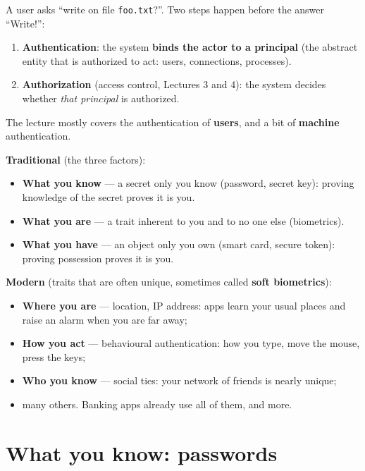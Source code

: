 \begin{defnbox}[title=Where does authentication fit?]
A user asks ``write on file \texttt{foo.txt}?''. Two steps happen before the answer ``Write!'':
\begin{enumerate}
  \item \textbf{Authentication}: the system \textbf{binds the actor to a principal} (the abstract
        entity that is authorized to act: users, connections, processes).
  \item \textbf{Authorization} (access control, Lectures 3 and 4): the system decides whether
        \emph{that principal} is authorized.
\end{enumerate}
The lecture mostly covers the authentication of \textbf{users}, and a bit of \textbf{machine}
authentication.
\end{defnbox}

\begin{defnbox}[title=Ways to prove who you are]
\textbf{Traditional} (the three factors):
\begin{itemize}
  \item \textbf{What you know} --- a secret only you know (password, secret key): proving
        knowledge of the secret proves it is you.
  \item \textbf{What you are} --- a trait inherent to you and to no one else (biometrics).
  \item \textbf{What you have} --- an object only you own (smart card, secure token): proving
        possession proves it is you.
\end{itemize}
\textbf{Modern} (traits that are often unique, sometimes called \textbf{soft biometrics}):
\begin{itemize}
  \item \textbf{Where you are} --- location, IP address: apps learn your usual places and raise an
        alarm when you are far away;
  \item \textbf{How you act} --- behavioural authentication: how you type, move the mouse, press
        the keys;
  \item \textbf{Who you know} --- social ties: your network of friends is nearly unique;
  \item many others. Banking apps already use all of them, and more.
\end{itemize}
\end{defnbox}

\section{What you know: passwords}

